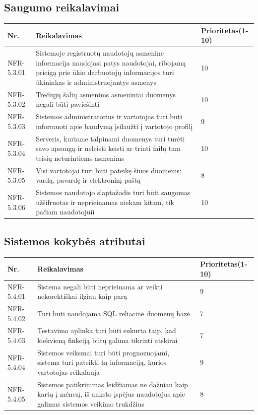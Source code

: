 \documentclass[oneside]{VUMIFPSkursinis}
\begin{document}
\subsection{Saugumo reikalavimai}
\begin{table}[htbp]
	\begin{tabularx}{1\textwidth}{ |P{2.5cm}|X|P{3cm }| }  \hline
		Nr. & Reikalavimas & Prioritetas(1-10) \\ \hline
		NFR-5.3.01 & Sistemoje registruotų naudotojų asmenine informacija naudojasi patys naudotojai, ribojamą prieigą prie ūkio darbuotojų informacijos turi ūkininkas ir administruojantys asmenys & 10 \\ \hline
		NFR-5.3.02 & Trečiųjų šalių asmenims asmeniniai duomenys negali būti paviešinti & 10 \\ \hline
		NFR-5.3.03 & Sistemos administratorius ir vartotojas turi būti informuoti apie bandymą įsilaužti į vartotojo profilį & 9 \\ \hline
		NFR-5.3.04 & Serveris, kuriame talpinami duomenys turi turėti savo apsaugą ir neleisti keisti ar trinti failų tam teisių neturintiems asmenims & 10 \\ \hline
		NFR-5.3.05 & Visi vartotojai turi būti pateikę šiuos duomenis: vardą, pavardę ir elektroninį paštą  & 8 \\ \hline
		NFR-5.3.06 & Sistemos naudotojo slaptažodis turi būti saugomas užšifruotas ir neprieinamas niekam kitam, tik pačiam naudotojuii & 10 \\ \hline
	\end{tabularx}
\end{table}
\subsection{Sistemos kokybės atributai}
\begin{table}[htbp]
	\begin{tabularx}{1\textwidth}{ |P{2.5cm}|X|P{3cm }| }  \hline
		Nr. & Reikalavimas & Prioritetas(1-10) \\ \hline
		NFR-5.4.01 & Sistema negali būti neprieinama ar veikti nekorektiškai ilgiau kaip parą & 9 \\ \hline
		NFR-5.4.02 & Turi būti naudojama SQL reliacinė duomenų bazė  & 7 \\ \hline
		NFR-5.4.03 & Testavimo aplinka turi būti sukurta taip, kad kiekvieną finkciją būtų galima tikrinti atskirai & 7 \\ \hline
		NFR-5.4.04 & Sistemos veiksmai turi būti prognozuojami, sistema turi pateikti tą informaciją, kurios vartotojas reikalauja & 9 \\ \hline
		NFR-5.4.05 & Sistemos patikrinimas leidžiamas ne dažniau kaip kartą į mėnesį, iš anksto įspėjus naudotojus apie galimus sistemos veikimo trukdžius  & 8 \\ \hline
	\end{tabularx}
\end{table}
\end{document}
